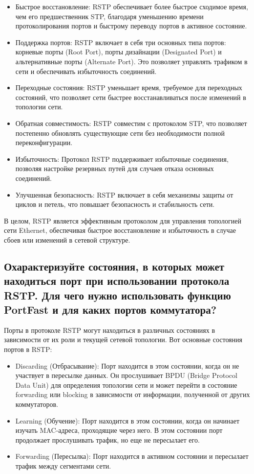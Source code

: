 \begin{itemize}
	\item Быстрое восстановление: RSTP обеспечивает более быстрое 
		сходимое время, чем его предшественник STP, благодаря 
		уменьшению времени протоколирования портов и быстрому 
		переводу портов в активное состояние.
	\item Поддержка портов: RSTP включает в себя три основных типа 
		портов: корневые порты (Root Port), порты дизайнации (Designated 
		Port) и альтернативные порты (Alternate Port). Это позволяет 
		управлять трафиком в сети и обеспечивать избыточность 
		соединений.
	\item Переходные состояния: RSTP уменьшает время, требуемое для 
		переходных состояний, что позволяет сети быстрее 
		восстанавливаться после изменений в топологии сети.
	\item Обратная совместимость: RSTP совместим с протоколом STP, что 
		позволяет постепенно обновлять существующие сети без 
		необходимости полной переконфигурации.
	\item Избыточность: Протокол RSTP поддерживает избыточные 
		соединения, позволяя настройке резервных путей для случаев отказа 
		основных соединений.
	\item Улучшенная безопасность: RSTP включает в себя механизмы 
		защиты от циклов и петель, что повышает безопасность и 
		стабильность сети.
\end{itemize}

В целом, RSTP является эффективным протоколом для управления 
топологией сети Ethernet, обеспечивая быстрое восстановление и 
избыточность в случае сбоев или изменений в сетевой структуре.

\subsection{Охарактеризуйте состояния, в которых может находиться порт при 
	использовании протокола RSTP. Для чего нужно использовать
	функцию PortFast и для каких портов коммутатора?}

Порты в протоколе RSTP могут находиться в различных состояниях в 
зависимости от их роли и текущей сетевой топологии. Вот основные 
состояния портов в RSTP:

\begin{itemize}
	\item Discarding (Отбрасывание): Порт находится в этом состоянии, когда 
		он не участвует в пересылке данных. Он прослушивает BPDU 
		(Bridge Protocol Data Unit) для определения топологии сети и может 
		перейти в состояние forwarding или blocking в зависимости от 
		информации, полученной от других коммутаторов.
	\item Learning (Обучение): Порт находится в этом состоянии, когда он 
		начинает изучать MAC-адреса, проходящие через него. В этом 
		состоянии порт продолжает прослушивать трафик, но еще не 
		пересылает его.
	\item Forwarding (Пересылка): Порт находится в активном состоянии и 
		пересылает трафик между сегментами сети.
\end{itemize}

